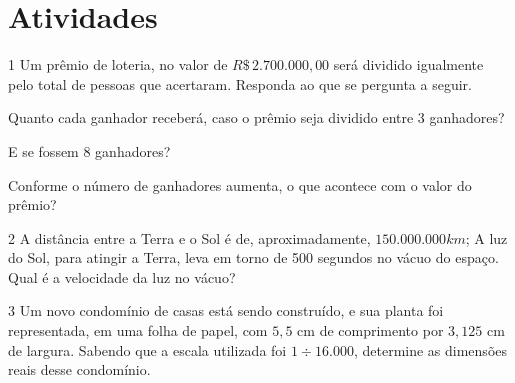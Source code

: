 \section*{Atividades}




\num{1} Um prêmio de loteria, no valor de $R\$\,2.700.000,00$ será dividido
igualmente pelo total de pessoas que acertaram. Responda ao que se pergunta a seguir.

\begin{escolha}[itemsep=0pt]
\item Quanto cada ganhador receberá, caso o prêmio seja dividido entre 3 ganhadores?\\

\item E se fossem 8 ganhadores?\\


\item Conforme o número de ganhadores aumenta, o que acontece com o valor do prêmio?\\

\end{escolha}


\num{2} A distância entre a Terra e o Sol é de, aproximadamente, $150.000.000 km$; 
A luz do Sol, para atingir a Terra, leva em torno de 500 segundos no vácuo do espaço.
Qual é a velocidade da luz no vácuo?

\bigskip




\bigskip

\num{3} Um novo condomínio de casas está sendo construído, e sua planta foi
representada, em uma folha de papel, com $5,5$ cm de comprimento por $3,125$
cm de largura. Sabendo que a escala utilizada foi $1 \div 16.000$, determine
as dimensões reais desse condomínio.

\bigskip


